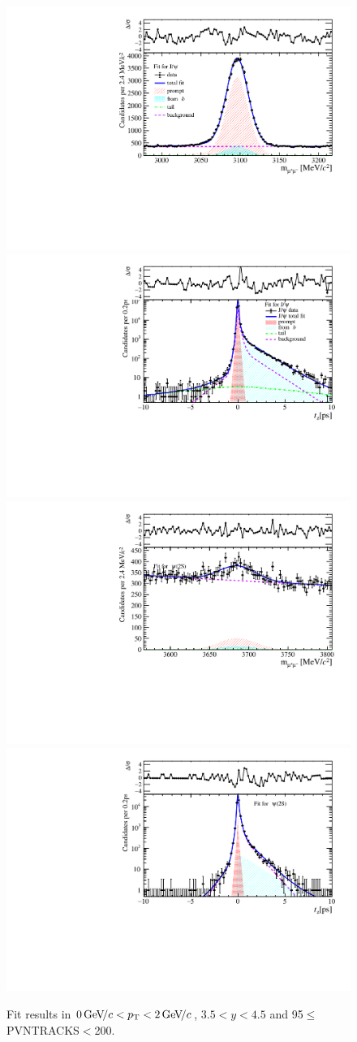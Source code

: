 \begin{figure}[H]
\begin{center}
\includegraphics[width=0.47\linewidth]{pdf/Jpsi/drawmass/n5y3pt1.pdf}
\includegraphics[width=0.47\linewidth]{pdf/Jpsi/2DFit/n5y3pt1.pdf}
\vspace*{-0.5cm}
\includegraphics[width=0.47\linewidth]{pdf/Psi2S/drawmass/n5y3pt1.pdf}
\includegraphics[width=0.47\linewidth]{pdf/Psi2S/2DFit/n5y3pt1.pdf}
\vspace*{-0.5cm}
\end{center}
\caption{Fit results in $0\text{\,Ge\kern -0.1em V\!/}c<p_{\mathrm{T}}<2\text{\,Ge\kern -0.1em V\!/}c$, $3.5<y<4.5$ and 95$\leq$PVNTRACKS$<$200.}
\label{Fitn5y3pt1}
\end{figure}
